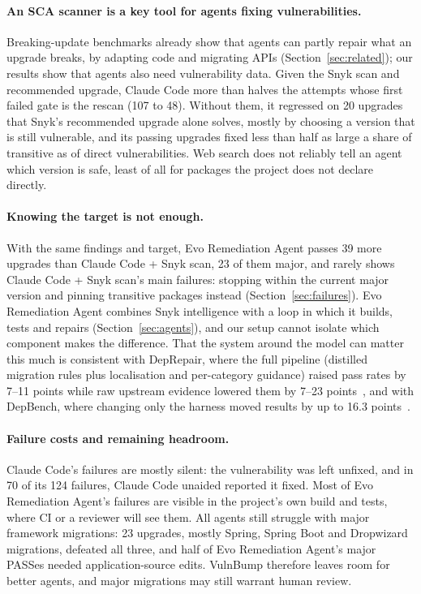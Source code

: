 \documentclass[11pt]{article}
\theoremstyle{definition}
\newcommand{\bench}{VulnBump}
\newcommand{\evo}{Evo Remediation Agent}
\newcommand{\aided}{Claude Code + Snyk scan}
\newcommand{\unaided}{Claude Code unaided}
\begin{document}
\paragraph{An SCA scanner is a key tool for agents fixing vulnerabilities.} Breaking-update benchmarks already show that agents can partly repair what an upgrade breaks, by adapting code and migrating APIs (Section~\ref{sec:related}); our results show that agents also need vulnerability data. Given the Snyk scan and recommended upgrade, Claude Code more than halves the attempts whose first failed gate is the rescan (107 to 48). Without them, it regressed on 20 upgrades that Snyk's recommended upgrade alone solves, mostly by choosing a version that is still vulnerable, and its passing upgrades fixed less than half as large a share of transitive as of direct vulnerabilities. Web search does not reliably tell an agent which version is safe, least of all for packages the project does not declare directly.

\paragraph{Knowing the target is not enough.} With the same findings and target, \evo{} passes 39 more upgrades than \aided{}, 23 of them major, and rarely shows \aided{}'s main failures: stopping within the current major version and pinning transitive packages instead (Section~\ref{sec:failures}). \evo{} combines Snyk intelligence with a loop in which it builds, tests and repairs (Section~\ref{sec:agents}), and our setup cannot isolate which component makes the difference. That the system around the model can matter this much is consistent with DepRepair, where the full pipeline (distilled migration rules plus localisation and per-category guidance) raised pass rates by 7--11 points while raw upstream evidence lowered them by 7--23 points~\cite{yang2026deprepair}, and with DepBench, where changing only the harness moved results by up to 16.3 points~\cite{luo2026depbench}.

\paragraph{Failure costs and remaining headroom.} Claude Code's failures are mostly silent: the vulnerability was left unfixed, and in 70 of its 124 failures, \unaided{} reported it fixed. Most of \evo{}'s failures are visible in the project's own build and tests, where CI or a reviewer will see them. All agents still struggle with major framework migrations: 23 upgrades, mostly Spring, Spring Boot and Dropwizard migrations, defeated all three, and half of \evo{}'s major PASSes needed application-source edits. \bench{} therefore leaves room for better agents, and major migrations may still warrant human review.
\end{document}

